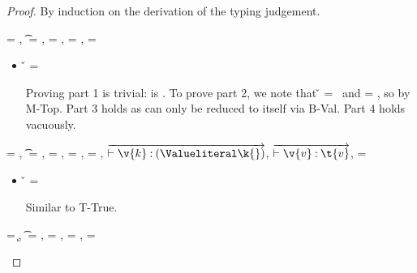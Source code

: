 {}

{}

\begin{lemma} \label{appendix:lemma:soundness}
{\soundnesslemmahypothesis}
\begin{proof}
By induction on the derivation of the typing judgement.

\begin{case}[T-True]
  \e{} = \true, \t{} = \True, \thenprop{\prop{}} = \topprop{}, \elseprop{\prop{}} = \botprop{}, \object{} = \emptyobject{}

  \begin{itemize}
    \item[] 
      \begin{subcase}[B-Val]
        \v{} = \true{}

        Proving part 1 is trivial: \object{} is \emptyobject. 
        To prove part 2, we note that \v{} = \true\ 
        and \thenprop{\prop{}} = \topprop{}, so \satisfies{\openv{}}{\thenprop{\prop{}}} by M-Top.
        Part 3 holds as \e{} can only be reduced to itself via B-Val.
        Part 4 holds vacuously.
      \end{subcase}
  \end{itemize}
\end{case}

\begin{case}[T-HMap] \e{} = {},
  \t{} = {\HMapc {\mandatory{}}},
  \thenprop{\prop{}} = {\topprop{}},
  \elseprop{\prop{}} = {\botprop{}},
  \object{} = {\emptyobject{}},
  $\overrightarrow{\judgementtwo {} {\hastype{\v{k}}{\Value \k{}}}}$,
  $\overrightarrow{\judgementtwo {} {\hastype{\v{v}}{\t{v}}}}$,
  \mandatory{} = 

  \begin{itemize}
    \item[]
      \begin{subcase}[B-Val] \v{} = {}

        Similar to T-True.
      \end{subcase}
  \end{itemize}
\end{case}

\begin{case}[T-Kw] \e{} = {\k{}},
  \t{} = {\Value{\k{}}},
  \thenprop{\prop{}} = {\topprop{}},
  \elseprop{\prop{}} = {\botprop{}},
  \object{} = {\emptyobject{}}


\end{case}
\end{proof}
\end{lemma}
